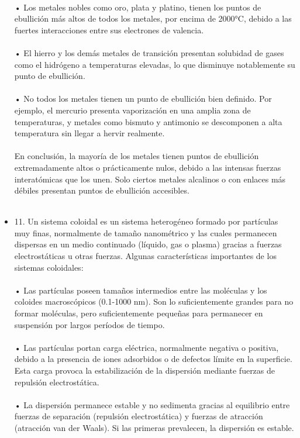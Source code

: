 \documentclass{article}
\begin{document}
\begin{itemize}
\\
• Los metales nobles como oro, plata y platino, tienen los puntos de ebullición más altos de todos los metales, por encima de 2000°C, debido a las fuertes interacciones entre sus electrones de valencia.\\
\\
• El hierro y los demás metales de transición presentan solubidad de gases como el hidrógeno a temperaturas elevadas, lo que disminuye notablemente su punto de ebullición.\\
\\
• No todos los metales tienen un punto de ebullición bien definido. Por ejemplo, el mercurio presenta vaporización en una amplia zona de temperaturas, y metales como bismuto y antimonio se descomponen a alta temperatura sin llegar a hervir realmente.\\
\\
En conclusión, la mayoría de los metales tienen puntos de ebullición extremadamente altos o prácticamente nulos, debido a las intensas fuerzas interatómicas que los unen. Solo ciertos metales alcalinos o con enlaces más débiles presentan puntos de ebullición accesibles.\\
\\
\item{11.}
Un sistema coloidal es un sistema heterogéneo formado por partículas muy finas, normalmente de tamaño nanométrico y las cuales permanecen dispersas en un medio continuado (líquido, gas o plasma) gracias a fuerzas electrostáticas u otras fuerzas. Algunas características importantes de los sistemas coloidales:\\
\\
• Las partículas poseen tamaños intermedios entre las moléculas y los coloides macroscópicos (0.1-1000 nm). Son lo suficientemente grandes para no formar moléculas, pero suficientemente pequeñas para permanecer en suspensión por largos períodos de tiempo.\\
\\
• Las partículas portan carga eléctrica, normalmente negativa o positiva, debido a la presencia de iones adsorbidos o de defectos límite en la superficie. Esta carga provoca la estabilización de la dispersión mediante fuerzas de repulsión electrostática.\\
\\
• La dispersión permanece estable y no sedimenta gracias al equilibrio entre fuerzas de separación (repulsión electrostática) y fuerzas de atracción (atracción van der Waals). Si las primeras prevalecen, la dispersión es estable.\\

\end{itemize}
\end{document}
